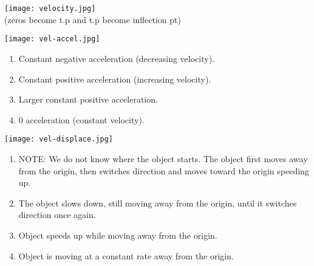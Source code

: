 \documentclass[12pt,fleqn]{book} %
\begin{document}
\begin{multicols}{2}
    \texttt{[image: velocity.jpg]} \\
    (zeros become t.p and t.p become inflection pt) \\
    \begin{center}
        \texttt{[image: vel-accel.jpg]}
        \begin{enumerate}[label=(\alph*)]
            \item Constant negative acceleration (decreasing velocity).
            \item Constant positive acceleration (increasing velocity).
            \item Larger constant positive acceleration.
            \item 0 acceleration (constant velocity).
        \end{enumerate}

    \end{center}
    \columnbreak

    \hspace*{-20mm}

    \begin{center}
        \vspace*{3mm}
        \texttt{[image: vel-displace.jpg]}
        \begin{enumerate}[label=(\alph*)]
            \item NOTE: We do not know where the object starts. The object first moves away from the origin, then switches direction and moves toward the origin speeding up.
            \item The object slows down, still moving away from the origin, until it switches direction once again.
            \item Object speeds up while moving away from the origin.
            \item Object is moving at a constant rate away from the origin.
        \end{enumerate}

    \end{center}
\end{multicols}

\pagebreak
\end{document}
